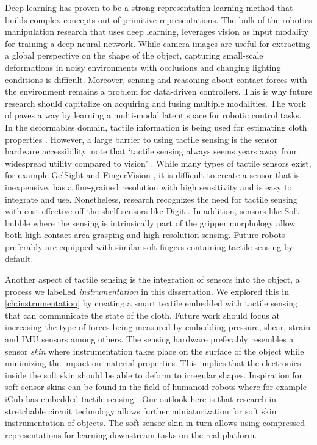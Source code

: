 \documentclass[\home/main.tex]{subfiles}
\begin{document}

Deep learning has proven to be a strong representation learning method that builds complex concepts out of primitive representations. The bulk of the robotics manipulation research that uses deep learning, leverages vision as input modality for training a deep neural network. While camera images are useful for extracting a global perspective on the shape of the object, capturing small-scale deformations in noisy environments with occlusions and changing lighting conditions is difficult. Moreover, sensing and reasoning about contact forces with the environment remains a problem for data-driven controllers. This is why future research should capitalize on acquiring and fusing multiple modalities. The work of \autocite{lee2020making} paves a way by learning a multi-modal latent space for robotic control tasks. In the deformables domain, tactile information is being used for estimating cloth properties \autocite{yuan2018active}. However, a large barrier to using tactile sensing is the sensor hardware accessibility. \citeauthor{Siciliano2008} note that `tactile sensing always seems years away from widespread utility compared to vision' \autocite{Siciliano2008}. While many types of tactile sensors exist, for example GelSight \autocite{donlon2018gelslim} and FingerVision \autocite{Yamaguchi2017}, it is difficult to create a sensor that is inexpensive, has a fine-grained resolution with high sensitivity and is easy to integrate and use. Nonetheless, research recognizes the need for tactile sensing with cost-effective off-the-shelf sensors like Digit \autocite{digit2020}. In addition, sensors like Soft-bubble \autocite{Alspach2019} where the sensing is intrinsically part of the gripper morphology allow both high contact area grasping and high-resolution sensing. Future robots preferably are equipped with similar soft fingers containing tactile sensing by default. 

Another aspect of tactile sensing is the integration of sensors into the object, a process we labelled \textit{instrumentation} in this dissertation. 
We explored this in \cref{ch:instrumentation} by creating a smart textile embedded with tactile sensing that can communicate the state of the cloth. Future work should focus at increasing the type of forces being measured by embedding pressure, shear, strain and IMU sensors among others. The sensing hardware preferably resembles a sensor \emph{skin} where instrumentation takes place on the surface of the object while minimizing the impact on material properties. This implies that the electronics inside the soft skin should be able to deform to irregular shapes. Inspiration for soft sensor skins can be found in the field of humanoid robots where for example iCub has embedded tactile sensing \autocite{Tomo2018}. Our outlook here is that research in stretchable circuit technology allows further miniaturization for soft skin instrumentation of objects. The soft sensor skin in turn allows using compressed representations for learning downstream tasks on the real platform. 
\end{document}
